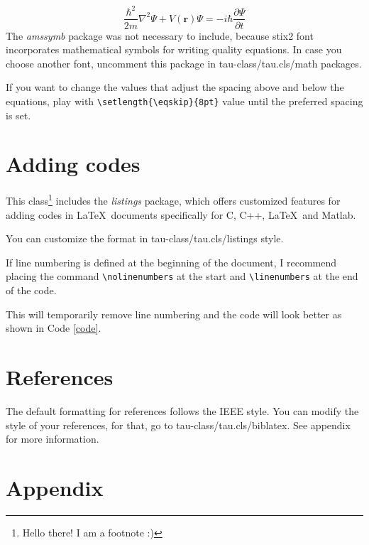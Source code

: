 \documentclass[9pt,a4paper,twoside]{tau-class/tau}
\begin{document}
	\begin{equation} \label{ec:equation}
		\frac{\hbar^2}{2m}\nabla^2\Psi + V(\mathbf{r})\Psi = -i\hbar \frac{\partial\Psi}{\partial t}
	\end{equation} 
    The \textit{amssymb} package was not necessary to include, because stix2 font incorporates mathematical symbols for writing quality equations. In case you choose another font, uncomment this package in tau-class/tau.cls/math packages.
	
    If you want to change the values that adjust the spacing above and below the equations, play with \verb|\setlength{\eqskip}{8pt}| value until the preferred spacing is set.
	
\section{Adding codes}
	
    This class\footnote{Hello there! I am a footnote :)} includes the \textit{listings} package, which offers customized features for adding codes in \LaTeX\ documents specifically for C, C++, \LaTeX\ and Matlab. 
	
    You can customize the format in tau-class/tau.cls/listings style.
	
        \nolinenumbers
            
	\linenumbers
	
    If line numbering is defined at the beginning of the document, I recommend placing the command \verb|\nolinenumbers| at the start and \verb|\linenumbers| at the end of the code. 
	
    This will temporarily remove line numbering and the code will look better as shown in Code \ref{code}.
	
\section{References}

    The default formatting for references follows the IEEE style. You can modify the style of your references, for that, go to tau-class/tau.cls/biblatex. See appendix for more information.
	
\section{Appendix}
\end{document}
